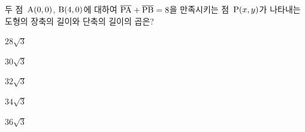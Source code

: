두 점~$\mathrm{A}(0{,}\mkern3mu\mathopen{}0)$, $\mathrm{B}(4{,}\mkern3mu\mathopen{}0)$에 대하여 $\overline{\mathrm{PA}}+\overline{\mathrm{PB}}=8$을 만족시키는 점~$\mathrm{P}(x{,}\mkern3mu\mathopen{}y)$가 나타내는 도형의 장축의 길이와 단축의 길이의 곱은?
\begin{choices32}{\rule[-3ex]{0pt}{8ex}$28\sqrt{3}$}{\rule[-3ex]{0pt}{8ex}$30\sqrt{3}$}{\rule[-3ex]{0pt}{8ex}$32\sqrt{3}$}{\rule[-3ex]{0pt}{8ex}$34\sqrt{3}$}{\rule[-3ex]{0pt}{8ex}$36\sqrt{3}$}\end{choices32}
